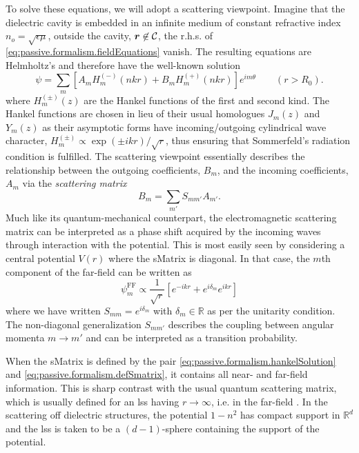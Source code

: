 To solve these equations, we will adopt a scattering viewpoint. 
Imagine that the dielectric cavity is embedded in an infinite
medium of constant refractive index  $n_o=\sqrt{\epsilon\mu}$, 
outside the cavity, $\boldsymbol{r}\not\in{\mathcal{C}}$, 
the r.h.s. of \eqref{eq:passive.formalism.fieldEquations} vanish. 
The resulting equations are Helmholtz's and therefore have the well-known solution
  \begin{equation}
    \label{eq:passive.formalism.hankelSolution}
    \psi = \sum_{m} \left[A_m H_m^{(-)}(nkr) + B_m H_m^{(+)}(nkr)\right]e^{im\theta} \qquad (r>R_0).
  \end{equation}
where $H_m^{(\pm)}(z)$ are the Hankel functions of the first
and second kind. The Hankel functions are chosen in lieu of their
usual homologues $J_m(z)$ and $Y_m(z)$ as their asymptotic forms 
have incoming/outgoing cylindrical wave character, 
$H_m^{(\pm)}\propto \exp(\pm ikr)/\sqrt{r}$, thus ensuring that
Sommerfeld's radiation condition is fulfilled. The scattering
viewpoint essentially describes the relationship between the 
outgoing coefficients, $B_m$, and the incoming coefficients, $A_m$
via the \textit{scattering matrix}
  \begin{equation}
  	\label{eq:passive.formalism.defSmatrix}
    B_m = \sum_{m'}S_{mm'}A_{m'}. 
  \end{equation}
Much like its quantum-mechanical counterpart, the electromagnetic scattering
matrix can be interpreted as a phase shift acquired by the incoming
waves through interaction with the potential. This is most easily seen
by considering a central potential $V(r)$ where the \gls{sMatrix}
is diagonal. In that case, the $m$th component of the far-field can
be written as
  \begin{equation}
   \label{eq:passive.formalism.centralPotentialField}
   \psi_m^\text{FF} \propto \frac{1}{\sqrt{r}}\left[e^{-ikr}+e^{i\delta_m}e^{ikr}\right]
  \end{equation}
where we have written $S_{mm}=e^{i\delta_m}$ with $\delta_m\in\mathbb{R}$ 
as per the unitarity condition. The non-diagonal
generalization $S_{mm'}$ describes the coupling between angular
momenta $m\rightarrow m'$ and can be interpreted as a transition
probability.

When the \gls{sMatrix} is defined by the pair \eqref{eq:passive.formalism.hankelSolution}
and \eqref{eq:passive.formalism.defSmatrix}, it contains all near- and
far-field information. This is sharp contrast with the usual quantum 
scattering matrix, which is usually defined for an \gls{lss} having 
$r\rightarrow\infty$, i.e. in the far-field \cite{NEW1982}. In the scattering off dielectric structures, the potential 
$1-n^2$ has compact support in $\mathbb{R}^d$ and the \gls{lss} is taken to be 
a $(d-1)$-sphere containing the support of the potential.

